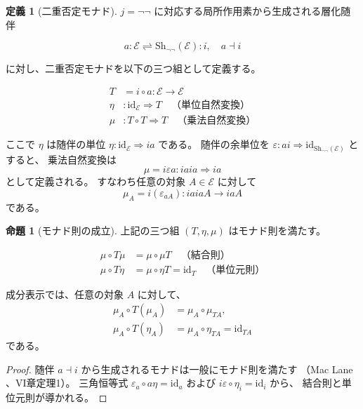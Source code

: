 \documentclass[11pt,a4paper]{article}
\theoremstyle{definition}
\newtheorem{definition}{定義}[section]
\newtheorem{proposition}{命題}[section]
\newcommand{\Sh}{\mathrm{Sh}_{\neg\neg}}
\newcommand{\topos}{\mathcal{E}}
\newcommand{\id}{\mathrm{id}}
\begin{document}
\begin{definition}[二重否定モナド]
$j = \neg\neg$ に対応する局所作用素から生成される層化随伴

\[
a : \topos \rightleftharpoons \Sh(\topos) : i, \quad a \dashv i
\]

に対し、二重否定モナドを以下の三つ組として定義する。

\begin{align}
T &= i \circ a : \topos \to \topos \\
\eta &: \id_{\topos} \Rightarrow T \quad \text{（単位自然変換）} \\
\mu &: T \circ T \Rightarrow T \quad \text{（乗法自然変換）}
\end{align}

ここで $\eta$ は随伴の単位 $\eta: \id_{\topos} \Rightarrow ia$ である。
随伴の余単位を
$\varepsilon: ai \Rightarrow \id_{\Sh(\topos)}$ とすると、
乗法自然変換は
\begin{equation}
\mu = i\varepsilon a : iaia \Rightarrow ia
\label{eq:dn_mu}
\end{equation}
として定義される。
すなわち任意の対象 $A \in \topos$ に対して
\begin{equation}
\mu_A = i(\varepsilon_{aA}): i a i a A \to i a A
\end{equation}
である。
\end{definition}

\begin{proposition}[モナド則の成立]
上記の三つ組 $(T, \eta, \mu)$ はモナド則を満たす。

\begin{align}
\mu \circ T\mu &= \mu \circ \mu T \quad \text{（結合則）}\\
\mu \circ T\eta &= \mu \circ \eta T = \id_T \quad \text{（単位元則）}
\end{align}

成分表示では、任意の対象 $A$ に対して、
\begin{align}
\mu_A \circ T(\mu_A)
  &= \mu_A \circ \mu_{T A},\\
\mu_A \circ T(\eta_A)
  &= \mu_A \circ \eta_{T A}
  = \id_{T A}
\end{align}
である。
\end{proposition}

\begin{proof}
随伴 $a \dashv i$ から生成されるモナドは一般にモナド則を満たす
（Mac Lane \cite{MacLane1971}、VI章定理1）。
三角恒等式 $\varepsilon_a \circ a\eta = \id_a$ および
$i\varepsilon \circ \eta_i = \id_i$ から、
結合則と単位元則が導かれる。
\end{proof}
\end{document}
